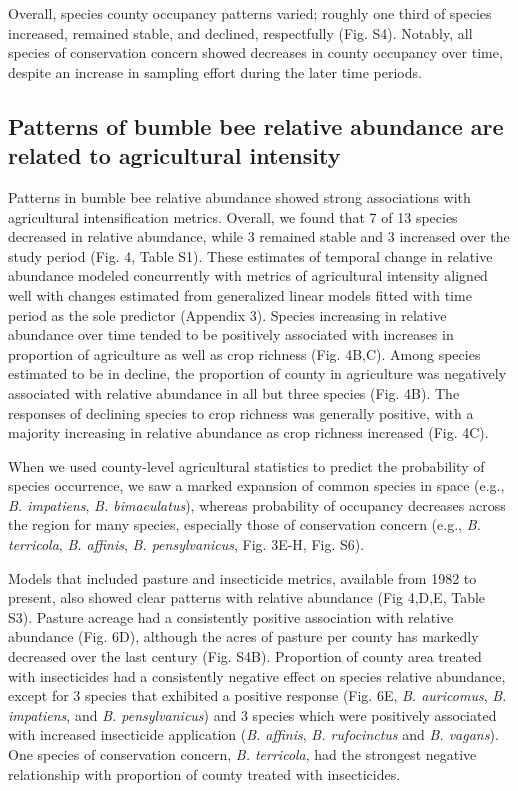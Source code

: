 \documentclass[11pt,]{article}
\begin{document}
Overall, species county occupancy patterns varied; roughly one third of
species increased, remained stable, and declined, respectfully (Fig.
S4). Notably, all species of conservation concern showed decreases in
county occupancy over time, despite an increase in sampling effort
during the later time periods.

\hypertarget{patterns-of-bumble-bee-relative-abundance-are-related-to-agricultural-intensity}{%
\subsection{Patterns of bumble bee relative abundance are related to
agricultural
intensity}\label{patterns-of-bumble-bee-relative-abundance-are-related-to-agricultural-intensity}}

Patterns in bumble bee relative abundance showed strong associations
with agricultural intensification metrics. Overall, we found that 7 of
13 species decreased in relative abundance, while 3 remained stable and
3 increased over the study period (Fig. 4, Table S1). These estimates of
temporal change in relative abundance modeled concurrently with metrics
of agricultural intensity aligned well with changes estimated from
generalized linear models fitted with time period as the sole predictor
(Appendix 3). Species increasing in relative abundance over time tended
to be positively associated with increases in proportion of agriculture
as well as crop richness (Fig. 4B,C). Among species estimated to be in
decline, the proportion of county in agriculture was negatively
associated with relative abundance in all but three species (Fig. 4B).
The responses of declining species to crop richness was generally
positive, with a majority increasing in relative abundance as crop
richness increased (Fig. 4C).

When we used county-level agricultural statistics to predict the
probability of species occurrence, we saw a marked expansion of common
species in space (e.g., \emph{B. impatiens}, \emph{B. bimaculatus}),
whereas probability of occupancy decreases across the region for many
species, especially those of conservation concern (e.g., \emph{B.
terricola}, \emph{B. affinis}, \emph{B. pensylvanicus}, Fig. 3E-H, Fig.
S6).

Models that included pasture and insecticide metrics, available from
1982 to present, also showed clear patterns with relative abundance (Fig
4,D,E, Table S3). Pasture acreage had a consistently positive
association with relative abundance (Fig. 6D), although the acres of
pasture per county has markedly decreased over the last century (Fig.
S4B). Proportion of county area treated with insecticides had a
consistently negative effect on species relative abundance, except for 3
species that exhibited a positive response (Fig. 6E, \emph{B.
auricomus}, \emph{B. impatiens}, and \emph{B. pensylvanicus}) and 3
species which were positively associated with increased insecticide
application (\emph{B. affinis}, \emph{B. rufocinctus} and \emph{B.
vagans}). One species of conservation concern, \emph{B. terricola}, had
the strongest negative relationship with proportion of county treated
with insecticides.
\end{document}
